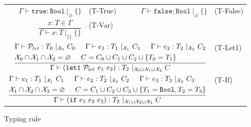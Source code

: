 \documentclass{article}
\begin{document}
\begin{figure}
    \centering
    \begin{tabular}{rlrl}
        $\Gamma \vdash \mathtt{true} : \mathtt{Bool}\ |_\varnothing\ \{\}$ & (T-True) &
        $\Gamma \vdash \mathtt{false} : \mathtt{Bool}\ |_\varnothing\ \{\}$ & (T-False) \vspace{5mm} \\

        $\dfrac{x : T \in \Gamma}{\Gamma \vdash x : T\ |_{\{\}}\ \{\}}$ & (T-Var) \vspace{5mm} \\

        \multicolumn{3}{r}{
        $\dfrac{\begin{aligned}
        &\Gamma \vdash \mathcal{P}_{let} : T_0\ |_{\mathcal{X}_0}\ C_0 \hspace{5mm}
        \Gamma \vdash e_1 : T_1\ |_{\mathcal{X}_1}\ C_1 \hspace{5mm}
        \Gamma \vdash e_2 : T_2\ |_{\mathcal{X}_2}\ C_2\\
        &\mathcal{X}_0 \cap \mathcal{X}_1 \cap \mathcal{X}_2 = \varnothing \hspace{5mm}
        C = C_0 \cup C_1 \cup C_2 \cup \{ T_0 = T_1 \}
        \end{aligned}}{\Gamma \vdash (\mathtt{let1}\ \mathcal{P}_{let}\ e_1\ e_2) : T_2\ |_{\mathcal{X}_0 \cup \mathcal{X}_1 \cup \mathcal{X}_2}\ C}$} & (T-Let1) \vspace{5mm} \\

        \multicolumn{3}{r}{
        $\dfrac{\begin{aligned}
        &\Gamma \vdash e_1 : T_1\ |_{\mathcal{X}_1}\ C_1 \hspace{5mm} \Gamma \vdash e_2 : T_2\ |_{\mathcal{X}_2}\ C_2 \hspace{5mm} \Gamma \vdash e_3 : T_3\ |_{\mathcal{X}_3}\ C_3 \\
        &\mathcal{X}_1 \cap \mathcal{X}_2 \cap \mathcal{X}_3 = \varnothing \hspace{5mm} C = C_1 \cup C_2 \cup C_3 \cup \{ T_1 = \mathtt{Bool}, T_2 = T_3 \}
        \end{aligned}}{\Gamma \vdash (\mathtt{if}\ e_1\ e_2\ e_3) : T_2\ |_{\mathcal{X}_1 \cup \mathcal{X}_2 \cup \mathcal{X}_3}\ C}$} & (T-If) \vspace{5mm} \\
    \end{tabular}
    \caption{Typing rule}
\end{figure}
\end{document}
